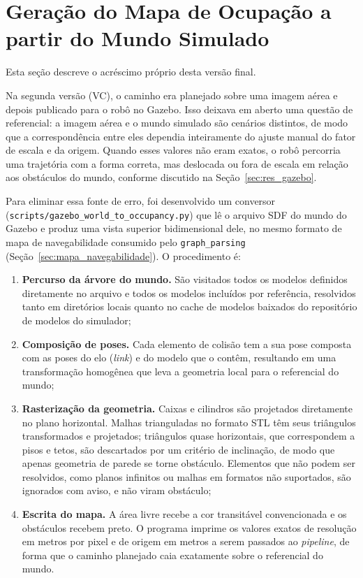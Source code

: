 \documentclass[
    12pt,
    openright,
    oneside,
    a4paper,
    english,
    brazil
]{abntex2}
\begin{document}
\section{Geração do Mapa de Ocupação a partir do Mundo Simulado}
\label{sec:mapa_ocupacao}

Esta seção descreve o acréscimo próprio desta versão final.

Na segunda versão (VC), o caminho era planejado sobre uma imagem aérea e depois publicado para o robô no Gazebo. Isso deixava em aberto uma questão de referencial: a imagem aérea e o mundo simulado são cenários distintos, de modo que a correspondência entre eles dependia inteiramente do ajuste manual do fator de escala e da origem. Quando esses valores não eram exatos, o robô percorria uma trajetória com a forma correta, mas deslocada ou fora de escala em relação aos obstáculos do mundo, conforme discutido na Seção~\ref{sec:res_gazebo}.

Para eliminar essa fonte de erro, foi desenvolvido um conversor (\texttt{scripts/\allowbreak gazebo\_\allowbreak world\_\allowbreak to\_\allowbreak occupancy.py}) que lê o arquivo SDF do mundo do Gazebo e produz uma vista superior bidimensional dele, no mesmo formato de mapa de navegabilidade consumido pelo \texttt{graph\_parsing} (Seção~\ref{sec:mapa_navegabilidade}). O procedimento é:

\begin{enumerate}
    \item \textbf{Percurso da árvore do mundo.} São visitados todos os modelos definidos diretamente no arquivo e todos os modelos incluídos por referência, resolvidos tanto em diretórios locais quanto no cache de modelos baixados do repositório de modelos do simulador;
    \item \textbf{Composição de poses.} Cada elemento de colisão tem a sua pose composta com as poses do elo (\textit{link}) e do modelo que o contêm, resultando em uma transformação homogênea que leva a geometria local para o referencial do mundo;
    \item \textbf{Rasterização da geometria.} Caixas e cilindros são projetados diretamente no plano horizontal. Malhas trianguladas no formato STL têm seus triângulos transformados e projetados; triângulos quase horizontais, que correspondem a pisos e tetos, são descartados por um critério de inclinação, de modo que apenas geometria de parede se torne obstáculo. Elementos que não podem ser resolvidos, como planos infinitos ou malhas em formatos não suportados, são ignorados com aviso, e não viram obstáculo;
    \item \textbf{Escrita do mapa.} A área livre recebe a cor transitável convencionada e os obstáculos recebem preto. O programa imprime os valores exatos de resolução em metros por pixel e de origem em metros a serem passados ao \textit{pipeline}, de forma que o caminho planejado caia exatamente sobre o referencial do mundo.
\end{enumerate}
\end{document}
